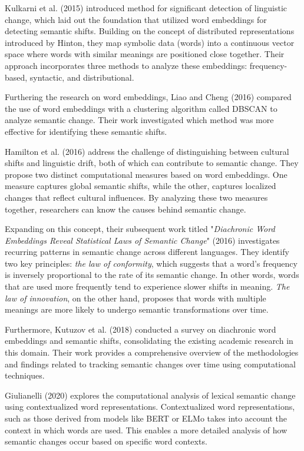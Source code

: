 Kulkarni et al. (2015) introduced method for significant detection of linguistic change, which laid out the foundation that utilized word embeddings for detecting semantic shifts.
Building on the concept of distributed representations introduced by Hinton, they map symbolic data (words) into a continuous vector space where words with similar meanings are positioned close together.
Their approach incorporates three methods to analyze these embeddings: frequency-based, syntactic, and distributional.

Furthering the research on word embeddings, Liao and Cheng (2016) compared the use of word embeddings with a clustering algorithm called DBSCAN to analyze semantic change.
Their work investigated which method was more effective for identifying these semantic shifts.

Hamilton et al. (2016) address the challenge of distinguishing between cultural shifts and linguistic drift, both of which can contribute to semantic change.
They propose two distinct computational measures based on word embeddings.
One measure captures global semantic shifts, while the other, captures localized changes that reflect cultural influences.
By analyzing these two measures together, researchers can know the causes behind semantic change.

Expanding on this concept, their subsequent work titled "\textit{Diachronic Word Embeddings Reveal Statistical Laws of Semantic Change}" (2016) investigates recurring patterns in semantic change across different languages.
They identify two key principles: \textit{the law of conformity}, which suggests that a word's frequency is inversely proportional to the rate of its semantic change.
In other words, words that are used more frequently tend to experience slower shifts in meaning.
\textit{The law of innovation}, on the other hand, proposes that words with multiple meanings are more likely to undergo semantic transformations over time.

Furthermore, Kutuzov et al. (2018) conducted a survey on diachronic word embeddings and semantic shifts, consolidating the existing academic research in this domain.
Their work provides a comprehensive overview of the methodologies and findings related to tracking semantic changes over time using computational techniques.

Giulianelli (2020) explores the computational analysis of lexical semantic change using contextualized word representations.
Contextualized word representations, such as those derived from models like BERT or ELMo takes into account the context in which words are used.
This enables a more detailed analysis of how semantic changes occur based on specific word contexts.


